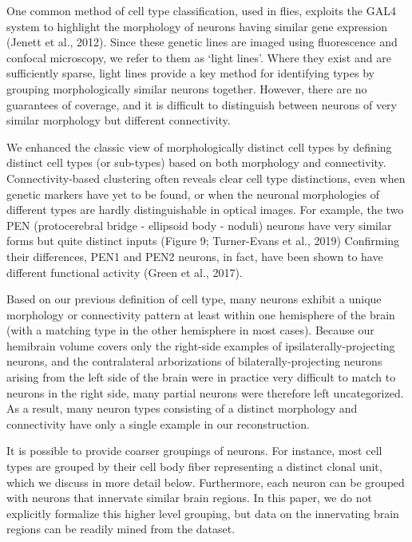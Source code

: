 \documentclass{article}
\begin{document}
One common method of cell type classification, used in flies, exploits the GAL4 system to highlight the morphology of neurons having similar gene expression (Jenett et al., 2012). Since these genetic lines are imaged using fluorescence and confocal microscopy, we refer to them as ‘light lines’. Where they exist and are sufficiently sparse, light lines provide a key method for identifying types by grouping morphologically similar neurons together. However, there are no guarantees of coverage, and it is difficult to distinguish between neurons of very similar morphology but different connectivity.

We enhanced the classic view of morphologically distinct cell types by defining distinct cell types (or sub-types) based on both morphology and connectivity. Connectivity-based clustering often reveals clear cell type distinctions, even when genetic markers have yet to be found, or when the neuronal morphologies of different types are hardly distinguishable in optical images. For example, the two PEN (protocerebral bridge - ellipsoid body - noduli) neurons have very similar forms but quite distinct inputs (Figure 9; Turner-Evans et al., 2019) Confirming their differences, PEN1 and PEN2 neurons, in fact, have been shown to have different functional activity (Green et al., 2017).

Based on our previous definition of cell type, many neurons exhibit a unique morphology or connectivity pattern at least within one hemisphere of the brain (with a matching type in the other hemisphere in most cases). Because our hemibrain volume covers only the right-side examples of ipsilaterally-projecting neurons, and the contralateral arborizations of bilaterally-projecting neurons arising from the left side of the brain were in practice very difficult to match to neurons in the right side, many partial neurons were therefore left uncategorized. As a result, many neuron types consisting of a distinct morphology and connectivity have only a single example in our reconstruction.


It is possible to provide coarser groupings of neurons. For instance, most cell types are grouped by their cell body fiber representing a distinct clonal unit, which we discuss in more detail below. Furthermore, each neuron can be grouped with neurons that innervate similar brain regions. In this paper, we do not explicitly formalize this higher level grouping, but data on the innervating brain regions can be readily mined from the dataset.
\end{document}
